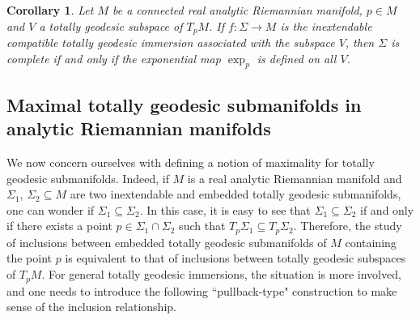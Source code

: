 \documentclass[11pt,a4paper,final]{amsart}
\newtheorem{corollary}[theorem]{Corollary}
\theoremstyle{definition}
\begin{document}
\begin{corollary}\label{cor:CompleteTGSubmanifolds}
	Let $M$ be a connected real analytic Riemannian manifold, $p\in M$ and $V$ a totally geodesic subspace of $T_{p}M$.
	If $f\colon \Sigma\to M$ is the inextendable compatible totally geodesic immersion associated with the subspace $V$, then $\Sigma$ is complete if and only if the exponential map $\exp_{p}$ is defined on all $V$.
\end{corollary}

\subsection{Maximal totally geodesic submanifolds in analytic Riemannian manifolds}
\label{subsec:maxtganalytic}

We now concern ourselves with defining a notion of maximality for totally geodesic submanifolds.
Indeed, if $M$ is a real analytic Riemannian manifold and $\Sigma_{1}$, $\Sigma_{2}\subseteq M$ are two inextendable and embedded totally geodesic submanifolds, one can wonder if $\Sigma_{1}\subseteq \Sigma_{2}$.
In this case, it is easy to see that $\Sigma_{1}\subseteq \Sigma_{2}$ if and only if there exists a point $p\in \Sigma_{1}\cap\Sigma_{2}$ such that $T_{p}\Sigma_{1}\subseteq T_{p}\Sigma_{2}$.
Therefore, the study of inclusions between embedded totally geodesic submanifolds of $M$ containing the point $p$ is equivalent to that of inclusions between totally geodesic subspaces of $T_{p}M$.
For general totally geodesic immersions, the situation is more involved, and one needs to introduce the following ``pullback-type" construction to make sense of the inclusion relationship.
\end{document}
